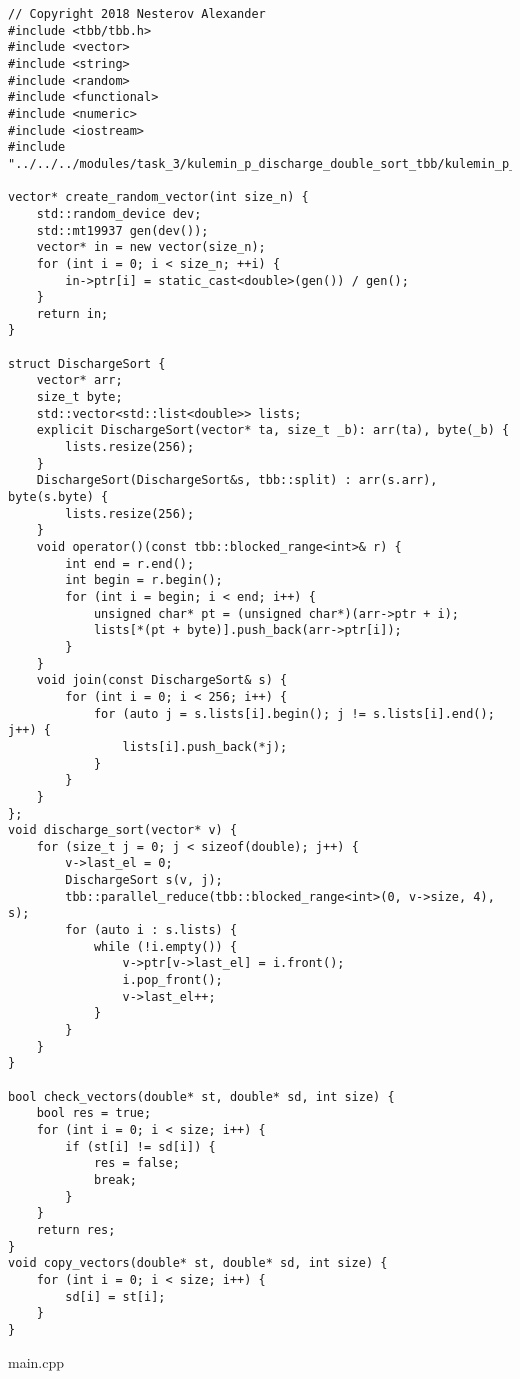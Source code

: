 \documentclass{report}
\begin{document}
\begin{lstlisting}
// Copyright 2018 Nesterov Alexander
#include <tbb/tbb.h>
#include <vector>
#include <string>
#include <random>
#include <functional>
#include <numeric>
#include <iostream>
#include "../../../modules/task_3/kulemin_p_discharge_double_sort_tbb/kulemin_p_discharge_double_sort_tbb.h"

vector* create_random_vector(int size_n) {
    std::random_device dev;
    std::mt19937 gen(dev());
    vector* in = new vector(size_n);
    for (int i = 0; i < size_n; ++i) {
        in->ptr[i] = static_cast<double>(gen()) / gen();
    }
    return in;
}

struct DischargeSort {
    vector* arr;
    size_t byte;
    std::vector<std::list<double>> lists;
    explicit DischargeSort(vector* ta, size_t _b): arr(ta), byte(_b) {
        lists.resize(256);
    }
    DischargeSort(DischargeSort&s, tbb::split) : arr(s.arr), byte(s.byte) {
        lists.resize(256);
    }
    void operator()(const tbb::blocked_range<int>& r) {
        int end = r.end();
        int begin = r.begin();
        for (int i = begin; i < end; i++) {
            unsigned char* pt = (unsigned char*)(arr->ptr + i);
            lists[*(pt + byte)].push_back(arr->ptr[i]);
        }
    }
    void join(const DischargeSort& s) {
        for (int i = 0; i < 256; i++) {
            for (auto j = s.lists[i].begin(); j != s.lists[i].end(); j++) {
                lists[i].push_back(*j);
            }
        }
    }
};
void discharge_sort(vector* v) {
    for (size_t j = 0; j < sizeof(double); j++) {
        v->last_el = 0;
        DischargeSort s(v, j);
        tbb::parallel_reduce(tbb::blocked_range<int>(0, v->size, 4), s);
        for (auto i : s.lists) {
            while (!i.empty()) {
                v->ptr[v->last_el] = i.front();
                i.pop_front();
                v->last_el++;
            }
        }
    }
}

bool check_vectors(double* st, double* sd, int size) {
    bool res = true;
    for (int i = 0; i < size; i++) {
        if (st[i] != sd[i]) {
            res = false;
            break;
        }
    }
    return res;
}
void copy_vectors(double* st, double* sd, int size) {
    for (int i = 0; i < size; i++) {
        sd[i] = st[i];
    }
}
\end{lstlisting}
main.cpp
\end{document}
